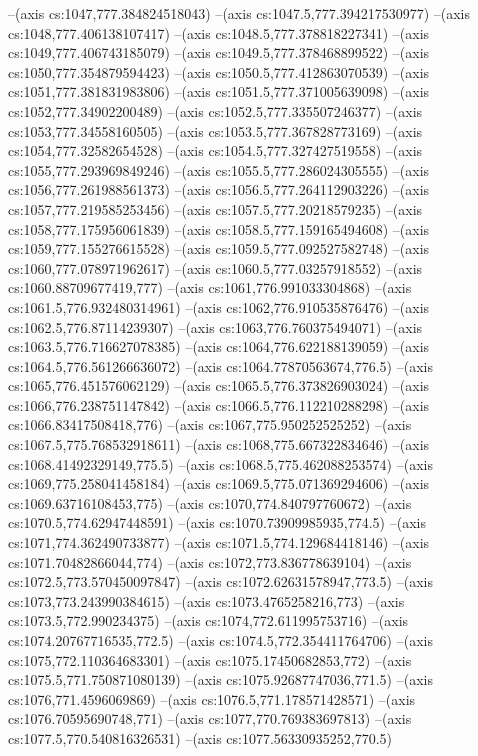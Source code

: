 --(axis cs:1047,777.384824518043)
--(axis cs:1047.5,777.394217530977)
--(axis cs:1048,777.406138107417)
--(axis cs:1048.5,777.378818227341)
--(axis cs:1049,777.406743185079)
--(axis cs:1049.5,777.378468899522)
--(axis cs:1050,777.354879594423)
--(axis cs:1050.5,777.412863070539)
--(axis cs:1051,777.381831983806)
--(axis cs:1051.5,777.371005639098)
--(axis cs:1052,777.34902200489)
--(axis cs:1052.5,777.335507246377)
--(axis cs:1053,777.34558160505)
--(axis cs:1053.5,777.367828773169)
--(axis cs:1054,777.32582654528)
--(axis cs:1054.5,777.327427519558)
--(axis cs:1055,777.293969849246)
--(axis cs:1055.5,777.286024305555)
--(axis cs:1056,777.261988561373)
--(axis cs:1056.5,777.264112903226)
--(axis cs:1057,777.219585253456)
--(axis cs:1057.5,777.20218579235)
--(axis cs:1058,777.175956061839)
--(axis cs:1058.5,777.159165494608)
--(axis cs:1059,777.155276615528)
--(axis cs:1059.5,777.092527582748)
--(axis cs:1060,777.078971962617)
--(axis cs:1060.5,777.03257918552)
--(axis cs:1060.88709677419,777)
--(axis cs:1061,776.991033304868)
--(axis cs:1061.5,776.932480314961)
--(axis cs:1062,776.910535876476)
--(axis cs:1062.5,776.87114239307)
--(axis cs:1063,776.760375494071)
--(axis cs:1063.5,776.716627078385)
--(axis cs:1064,776.622188139059)
--(axis cs:1064.5,776.561266636072)
--(axis cs:1064.77870563674,776.5)
--(axis cs:1065,776.451576062129)
--(axis cs:1065.5,776.373826903024)
--(axis cs:1066,776.238751147842)
--(axis cs:1066.5,776.112210288298)
--(axis cs:1066.83417508418,776)
--(axis cs:1067,775.950252525252)
--(axis cs:1067.5,775.768532918611)
--(axis cs:1068,775.667322834646)
--(axis cs:1068.41492329149,775.5)
--(axis cs:1068.5,775.462088253574)
--(axis cs:1069,775.258041458184)
--(axis cs:1069.5,775.071369294606)
--(axis cs:1069.63716108453,775)
--(axis cs:1070,774.840797760672)
--(axis cs:1070.5,774.62947448591)
--(axis cs:1070.73909985935,774.5)
--(axis cs:1071,774.362490733877)
--(axis cs:1071.5,774.129684418146)
--(axis cs:1071.70482866044,774)
--(axis cs:1072,773.836778639104)
--(axis cs:1072.5,773.570450097847)
--(axis cs:1072.62631578947,773.5)
--(axis cs:1073,773.243990384615)
--(axis cs:1073.4765258216,773)
--(axis cs:1073.5,772.990234375)
--(axis cs:1074,772.611995753716)
--(axis cs:1074.20767716535,772.5)
--(axis cs:1074.5,772.354411764706)
--(axis cs:1075,772.110364683301)
--(axis cs:1075.17450682853,772)
--(axis cs:1075.5,771.750871080139)
--(axis cs:1075.92687747036,771.5)
--(axis cs:1076,771.4596069869)
--(axis cs:1076.5,771.178571428571)
--(axis cs:1076.70595690748,771)
--(axis cs:1077,770.769383697813)
--(axis cs:1077.5,770.540816326531)
--(axis cs:1077.56330935252,770.5)
